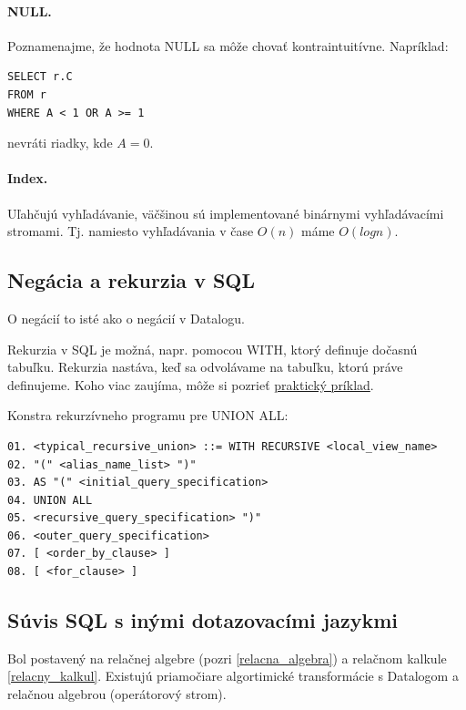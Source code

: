 \documentclass[10pt,a4paper]{article}
\begin{document}
\paragraph{NULL.}
Poznamenajme, že hodnota NULL sa môže chovať kontraintuitívne. 
Napríklad: 
\begin{verbatim}
SELECT r.C
FROM r
WHERE A < 1 OR A >= 1
\end{verbatim} 
nevráti riadky, kde $A=0$. 

\paragraph{Index.}
Uľahčujú vyhľadávanie, väčšinou sú implementované binárnymi vyhľadávacími stromami.
Tj. namiesto vyhľadávania v čase $O(n)$ máme $O(logn)$.

\subsection{Negácia a rekurzia v SQL}

O negácií to isté ako o negácií v Datalogu. 

Rekurzia v SQL je možná, napr. pomocou WITH, ktorý definuje dočasnú tabuľku. Rekurzia nastáva, keď sa odvolávame na tabuľku, ktorú práve definujeme. Koho viac zaujíma, môže si pozrieť \href{http://sqlanywhere.blogspot.sk/2012/04/example-recursive-union.html}{praktický príklad}. 

Konstra rekurzívneho programu pre UNION ALL: 
\begin{verbatim}
01. <typical_recursive_union> ::= WITH RECURSIVE <local_view_name>
02. "(" <alias_name_list> ")"
03. AS "(" <initial_query_specification>
04. UNION ALL
05. <recursive_query_specification> ")"
06. <outer_query_specification>
07. [ <order_by_clause> ]
08. [ <for_clause> ]
\end{verbatim} 

\subsection{Súvis SQL s inými dotazovacími jazykmi}

Bol postavený na relačnej algebre (pozri \ref{relacna_algebra}) a relačnom kalkule \ref{relacny_kalkul}. Existujú priamočiare algortimické transformácie s Datalogom a relačnou algebrou (operátorový strom). 
 
\end{document}
